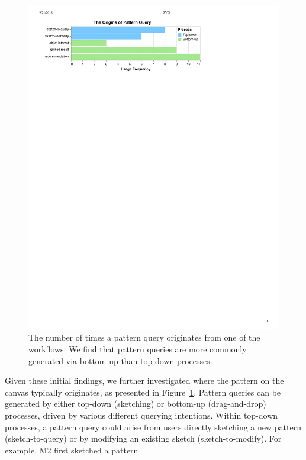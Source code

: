 \begin{figure}[h!]
  \includegraphics[width=\linewidth]{figures/the_origins_of_sketch.pdf}
  \vspace{-5pt}
  \caption{The number of times a pattern query originates from one of the workflows. We find that pattern queries are  more commonly generated via bottom-up than top-down processes.}\label{fig:origins_of_sketch}
  \vspace{-5pt}
\end{figure}
\par Given these initial findings,
we further investigated where the pattern
on the canvas typically originates, as presented in Figure~\ref{fig:origins_of_sketch}.
Pattern queries can be generated by
either top-down (sketching) or
bottom-up (drag-and-drop) processes,
driven by various different querying intentions.
Within top-down processes,
a pattern query could arise
from users directly sketching
a new pattern (sketch-to-query)
or by modifying an existing sketch (sketch-to-modify). For example, M2 first sketched a pattern
